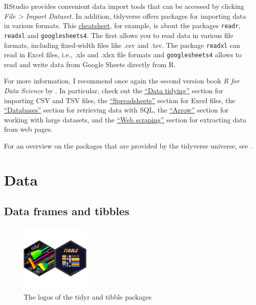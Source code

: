 \documentclass[
  12pt,
  oneside]{book}
\theoremstyle{definition}
\theoremstyle{definition}
\theoremstyle{definition}
\theoremstyle{definition}
\theoremstyle{remark}
\begin{document}
RStudio provides convenient data import tools that can be accessed by clicking \emph{File \textgreater{} Import Dataset}. In addition, tidyverse offers packages for importing data in various formats. This \href{https://posit.co/wp-content/uploads/2022/10/data-import.pdf}{cheatsheet}, for example, is about the packages \texttt{readr}, \texttt{readxl} and \texttt{googlesheets4}. The first allows you to read data in various file formats, including fixed-width files like .csv and .tsv. The package \texttt{readxl} can read in Excel files, i.e., .xls and .xlsx file formats and \texttt{googlesheets4} allows to read and write data from Google Sheets directly from R.

For more information, I recommend once again the second version book \emph{R for Data Science} by \href{https://r4ds.hadley.nz/}{\citet{Wickham2023R}}. In particular, check out the \href{https://r4ds.hadley.nz/data-tidy.html}{``Data tidying''} section for importing CSV and TSV files, the \href{https://r4ds.hadley.nz/spreadsheets.html}{``Spreadsheets''} section for Excel files, the \href{https://r4ds.hadley.nz/databases.html}{``Databases''} section for retrieving data with SQL, the \href{https://r4ds.hadley.nz/arrow.html}{``Arrow''} section for working with large datasets, and the \href{https://r4ds.hadley.nz/webscraping.html}{``Web scraping''} section for extracting data from web pages.

For an overview on the packages that are provided by the tidyverse universe, see \href{https://www.tidyverse.org/packages/\#import}{}.

\hypertarget{sec:tidy}{%
\section{Data}\label{sec:tidy}}

\hypertarget{data-frames-and-tibbles}{%
\subsection{Data frames and tibbles}\label{data-frames-and-tibbles}}

\begin{figure}
\centering
\includegraphics[width=0.3\textwidth,height=\textheight]{fig/tidyr-tibble-logo.png}
\caption{\label{fig:tidyr-tibble-logo} The logos of the tidyr and tibble packages}
\end{figure}
\end{document}
